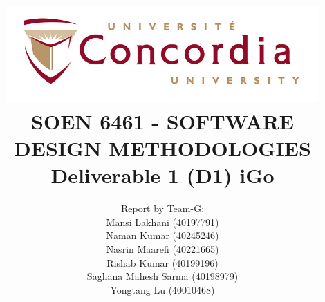 \begin{titlepage}

\newcommand{\HRule}{\rule{\linewidth}{0.5mm}} %
 
\title{\includegraphics[width=12cm]{title/concordia-logo.jpg}\\[2cm]
\textbf{SOEN 6461 - SOFTWARE DESIGN METHODOLOGIES}\\[.5em]
\textbf{Deliverable 1 (D1) iGo} }
\author{Report by Team-G:\\[.5em]
Mansi Lakhani (40197791) \\
Naman Kumar (40245246) \\ 
Nasrin Maarefi (40221665) \\ 
Rishab Kumar (40199196) \\
Saghana Mahesh Sarma (40198979)\\
Yongtang Lu (40010468) \\[1.2em]
}
\maketitle


\vfill %

\end{titlepage}